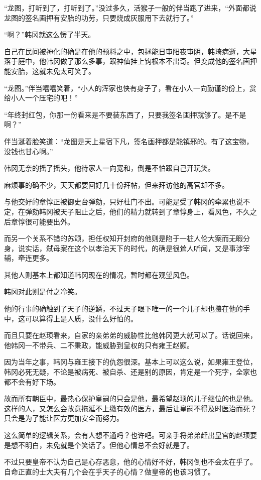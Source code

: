 “龙图，打听到了，打听到了。”没过多久，活猴子一般的伴当跑了进来，“外面都说龙图的签名画押有安胎的功劳，只要烧成灰服用下去就行了。”

“啊？”韩冈就这么愣了半天。

自己在民间被神化的确是在他的预料之中，包拯能日审阳夜审阴，韩琦病逝，大星落于庭中，他韩冈做了那么多事，跟神仙挂上钩根本不出奇。但变成他的签名画押能安胎，这就未免太可笑了。

“龙图。”伴当嘻嘻笑着，“小人的浑家也快有身子了，看在小人一向勤谨的份上，赏给小人一个压宅的吧！”

“年终封红包，你那一份看来是不要装东西了，只要我签名画押就够了。是不是啊？”

伴当涎着脸笑道：“龙图是天上星宿下凡，签名画押都是能镇邪的。有了这宝物，没钱也甘心啊。”

韩冈无奈的摇了摇头，他待家人一向宽和，倒是不怕跟自己开玩笑。

麻烦事的确不少，天天都要回好几十份拜帖，但来拜访他的高官却不多。

与他交好的章惇正被御史台弹劾，只好杜门不出。可能是受了韩冈的牵累也说不定，在弹劾韩冈被天子阻止之后，他们的精力就转到了章惇身上，看风色，不久之后章惇很可能要出外。

而另一个关系不错的苏颂，担任权知开封府的他则是陷于一桩人伦大案而无暇分身，说实话，弑母案在这个以孝治天下的时代，的确是很耸人听闻，又是事涉宰辅，牵连更多。

其他人则基本上都知道韩冈现在的情况，暂时都在观望风色。

韩冈对此则是付之冷笑。

他的行事的确触到了天子的逆鳞，不过天子眼下唯一的一个儿子却也攥在他的手中，这可以算得上是人质，没什么好怕的。

而且只要在赵顼看来，自家的亲弟弟的威胁性比他韩冈更大就可以了。话说回来，他韩冈一不带兵、二不秉政，能威胁到皇权的只有雍王赵颢。

因为当年之事，韩冈与雍王接下的仇怨很深。基本上可以这么说，如果雍王登位，韩冈必死无疑，不论是被病死、被自杀、还是别的原因，肯定是一个死字，全家也都不会有好下场。

故而所有朝臣中，最热心保护皇嗣的只会是他，最希望赵顼的儿子继位的也是他。这样的人，又怎么会故意拖延不上缴有效的医方，最后让皇嗣不得及时医治而死？只会是为了能让医方更加安全而努力。

这么简单的逻辑关系，会有人想不通吗？也许吧。可亲手将弟弟赶出皇宫的赵顼要是想不明白，未免就是个笑话了。但他心情总不会好就是了。

不过只要皇帝不认为自己是心存恶意，他的心情好不好，韩冈倒也不会太在乎了。自命正直的士大夫有几个会在乎天子的心情？做皇帝的也该习惯了。

